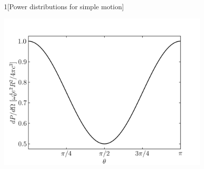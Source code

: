 \documentclass[12pt]{article}
\begin{document}
\begin{problem}{1}[Power distributions for simple motion]
\begin{solution}
\begin{center}
    \includegraphics[width=0.8\textwidth]{p1b.png} 
\end{center}
\end{solution}
\end{problem}
\newpage
\end{document}
